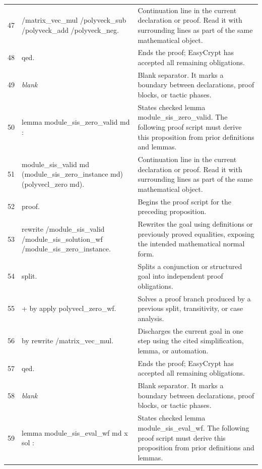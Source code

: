 \documentclass[10pt]{article}
\begin{document}
\begin{longtable}{r L{0.53\textwidth} L{0.37\textwidth}}
47 & {\ttfamily\scriptsize            /matrix\_vec\_mul /polyveck\_sub /polyveck\_add /polyveck\_neg.} & Continuation line in the current declaration or proof.  Read it with surrounding lines as part of the same mathematical object. \\
48 & {\ttfamily\scriptsize qed.} & Ends the proof; EasyCrypt has accepted all remaining obligations. \\
49 & {\ttfamily\scriptsize \emph{blank}} & Blank separator.  It marks a boundary between declarations, proof blocks, or tactic phases. \\
50 & {\ttfamily\scriptsize lemma module\_sis\_zero\_valid md :} & States checked lemma module\_sis\_zero\_valid.  The following proof script must derive this proposition from prior definitions and lemmas. \\
51 & {\ttfamily\scriptsize   module\_sis\_valid md (module\_sis\_zero\_instance md) (polyvecl\_zero md).} & Continuation line in the current declaration or proof.  Read it with surrounding lines as part of the same mathematical object. \\
52 & {\ttfamily\scriptsize proof.} & Begins the proof script for the preceding proposition. \\
53 & {\ttfamily\scriptsize rewrite /module\_sis\_valid /module\_sis\_solution\_wf /module\_sis\_zero\_instance.} & Rewrites the goal using definitions or previously proved equalities, exposing the intended mathematical normal form. \\
54 & {\ttfamily\scriptsize split.} & Splits a conjunction or structured goal into independent proof obligations. \\
55 & {\ttfamily\scriptsize + by apply polyvecl\_zero\_wf.} & Solves a proof branch produced by a previous split, transitivity, or case analysis. \\
56 & {\ttfamily\scriptsize by rewrite /matrix\_vec\_mul.} & Discharges the current goal in one step using the cited simplification, lemma, or automation. \\
57 & {\ttfamily\scriptsize qed.} & Ends the proof; EasyCrypt has accepted all remaining obligations. \\
58 & {\ttfamily\scriptsize \emph{blank}} & Blank separator.  It marks a boundary between declarations, proof blocks, or tactic phases. \\
59 & {\ttfamily\scriptsize lemma module\_sis\_eval\_wf md x sol :} & States checked lemma module\_sis\_eval\_wf.  The following proof script must derive this proposition from prior definitions and lemmas. \\

\end{longtable}
\end{document}
